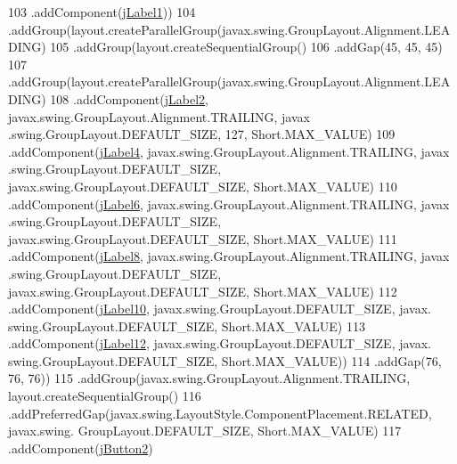 \begin{DoxyCode}
103                     .addComponent(\mbox{\hyperlink{class_interfaz_package_1_1_informacion_cliente_a76d63040cd29ebdaf61bb51a1f748393}{jLabel1}}))
104                 .addGroup(layout.createParallelGroup(javax.swing.GroupLayout.Alignment.LEADING)
105                     .addGroup(layout.createSequentialGroup()
106                         .addGap(45, 45, 45)
107                         .addGroup(layout.createParallelGroup(javax.swing.GroupLayout.Alignment.LEADING)
108                             .addComponent(\mbox{\hyperlink{class_interfaz_package_1_1_informacion_cliente_a1ff1b1422342b4b51d17fb166ec625ff}{jLabel2}}, javax.swing.GroupLayout.Alignment.TRAILING, javax
      .swing.GroupLayout.DEFAULT\_SIZE, 127, Short.MAX\_VALUE)
109                             .addComponent(\mbox{\hyperlink{class_interfaz_package_1_1_informacion_cliente_aa0124c463f35b5a5caaf6987b4329799}{jLabel4}}, javax.swing.GroupLayout.Alignment.TRAILING, javax
      .swing.GroupLayout.DEFAULT\_SIZE, javax.swing.GroupLayout.DEFAULT\_SIZE, Short.MAX\_VALUE)
110                             .addComponent(\mbox{\hyperlink{class_interfaz_package_1_1_informacion_cliente_a821aa89fbcb7dfaebf2fadaa9afe79e6}{jLabel6}}, javax.swing.GroupLayout.Alignment.TRAILING, javax
      .swing.GroupLayout.DEFAULT\_SIZE, javax.swing.GroupLayout.DEFAULT\_SIZE, Short.MAX\_VALUE)
111                             .addComponent(\mbox{\hyperlink{class_interfaz_package_1_1_informacion_cliente_acafa312ca1d5f92c4d3f969e1879289b}{jLabel8}}, javax.swing.GroupLayout.Alignment.TRAILING, javax
      .swing.GroupLayout.DEFAULT\_SIZE, javax.swing.GroupLayout.DEFAULT\_SIZE, Short.MAX\_VALUE)
112                             .addComponent(\mbox{\hyperlink{class_interfaz_package_1_1_informacion_cliente_af5593b23fec083a2c1f0cfccfb17b2ad}{jLabel10}}, javax.swing.GroupLayout.DEFAULT\_SIZE, javax.
      swing.GroupLayout.DEFAULT\_SIZE, Short.MAX\_VALUE)
113                             .addComponent(\mbox{\hyperlink{class_interfaz_package_1_1_informacion_cliente_ae99ca6a6dc9eb57f924b11c625ab6209}{jLabel12}}, javax.swing.GroupLayout.DEFAULT\_SIZE, javax.
      swing.GroupLayout.DEFAULT\_SIZE, Short.MAX\_VALUE))
114                         .addGap(76, 76, 76))
115                     .addGroup(javax.swing.GroupLayout.Alignment.TRAILING, layout.createSequentialGroup()
116                         .addPreferredGap(javax.swing.LayoutStyle.ComponentPlacement.RELATED, javax.swing.
      GroupLayout.DEFAULT\_SIZE, Short.MAX\_VALUE)
117                         .addComponent(\mbox{\hyperlink{class_interfaz_package_1_1_informacion_cliente_a18ab6870a03adb8b530c00f93ff9656b}{jButton2}})

\end{DoxyCode}
